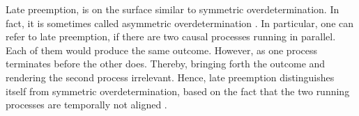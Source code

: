 \documentclass[11pt,a4paper]{book}
\theoremstyle{definition}
\theoremstyle{definition}
\theoremstyle{definition}
\theoremstyle{remark}
\begin{document}
%
%
%
%
%
%
%
%
%

Late preemption, is on the surface similar to symmetric overdetermination. In fact, it is sometimes called asymmetric overdetermination \parencite{erwig2010causal}. In particular, one can refer to late preemption, 
if there are two causal processes running in parallel. Each of them would produce the same outcome. However, as one process terminates before the other does. Thereby, bringing forth the outcome and rendering the second 
process irrelevant. Hence, late preemption distinguishes itself from symmetric overdetermination, based on the fact that the two running processes are temporally not aligned \parencite{beckers2018principled}.
\end{document}
